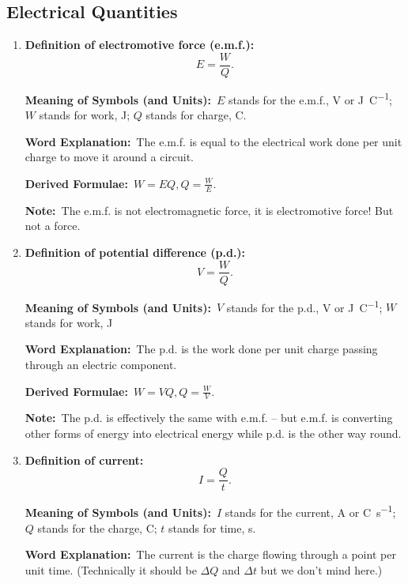 \documentclass[8pt]{article}
\newcommand{\MeanSymb}{\textbf{Meaning of Symbols (and Units):}\ }
\newcommand{\WordExpl}{\textbf{Word Explanation:}\ }
\newcommand{\DeriForm}{\textbf{Derived Formulae:}\ }
\newcommand{\Note}{\textbf{Note:}\ }
\begin{document}
        \subsection{Electrical Quantities}
            \begin{enumerate}
                \item \textbf{Definition of electromotive force (e.m.f.):}
                \[
                    E = \frac{W}{Q}.
                \]

                \MeanSymb \(E\) stands for the e.m.f., \unit{\volt} or \unit{\joule\per\coulomb}; \(W\) stands for work, \unit{\joule}; \(Q\) stands for charge, \unit{\coulomb}.

                \WordExpl The e.m.f. is equal to the electrical work done per unit charge to move it around a circuit.

                \DeriForm \(W = EQ, Q = \frac{W}{E}\).

                \Note The e.m.f. is not electromagnetic force, it is electromotive force! But not a force.

                \item \textbf{Definition of potential difference (p.d.):}
                \[
                    V = \frac{W}{Q}.
                \]

                \MeanSymb \(V\) stands for the p.d., \unit{\volt} or \unit{\joule\per\coulomb}; \(W\) stands for work, \unit{\joule}

                \WordExpl The p.d. is the work done per unit charge passing through an electric component.

                \DeriForm \(W = VQ, Q = \frac{W}{V}\).

                \Note The p.d. is effectively the same with e.m.f. -- but e.m.f. is converting other forms of energy into electrical energy while p.d. is the other way round.

                \item \textbf{Definition of current:}
                \[
                    I = \frac{Q}{t}.
                \]

                \MeanSymb \(I\) stands for the current, \unit{\ampere} or \unit{\coulomb\per\second}; \(Q\) stands for the charge, \unit{\coulomb}; \(t\) stands for time, \unit{\second}.

                \WordExpl The current is the charge flowing through a point per unit time. (Technically it should be \(\Delta Q\) and \(\Delta t\) but we don't mind here.)


\end{enumerate}
\end{document}
